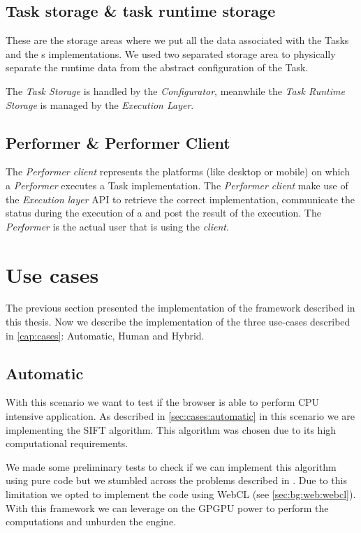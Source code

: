 \subsection{Task storage \& task runtime storage}
These are the storage areas where we put all the data associated with the Tasks
and the \utask{}s implementations. We used two separated storage area to physically
separate the runtime data from the abstract configuration of the Task.

The \emph{Task Storage} is handled by the \emph{Configurator}, meanwhile the
\emph{Task Runtime Storage} is managed by the \emph{Execution Layer}.\\



\subsection{Performer \& Performer Client}
The \emph{Performer client} represents the platforms (like desktop or mobile) on
which a \emph{Performer} executes a Task implementation. The \emph{Performer
client} make use of the \emph{Execution layer} API to retrieve the correct
implementation, communicate the status during the execution of a \utask{} and
post the result of the execution. The \emph{Performer} is the actual user that
is using the \emph{client}.







\section{Use cases}
\label{sec:implementation:use-cases}

The previous section presented the implementation of the framework described in
this thesis. Now we describe the implementation of the three use-cases described
in \ref{cap:cases}: Automatic, Human and Hybrid.

\subsection{Automatic}
With this scenario we want to test if the browser is able to perform CPU
intensive application. As described in \ref{sec:cases:automatic} in this
scenario we are implementing the \acf{SIFT} algorithm. This algorithm
was chosen due to its high computational requirements.

We made some preliminary tests to check if we can implement this algorithm using
pure \js{} code but we stumbled across the problems described in
. Due to this limitation we opted to implement the
code using \ac{WebCL} (see \ref{sec:bg:web:webcl}). With this framework we can
leverage on the \ac{GPGPU} power to perform the computations and unburden the
\js{} engine.\\ 

